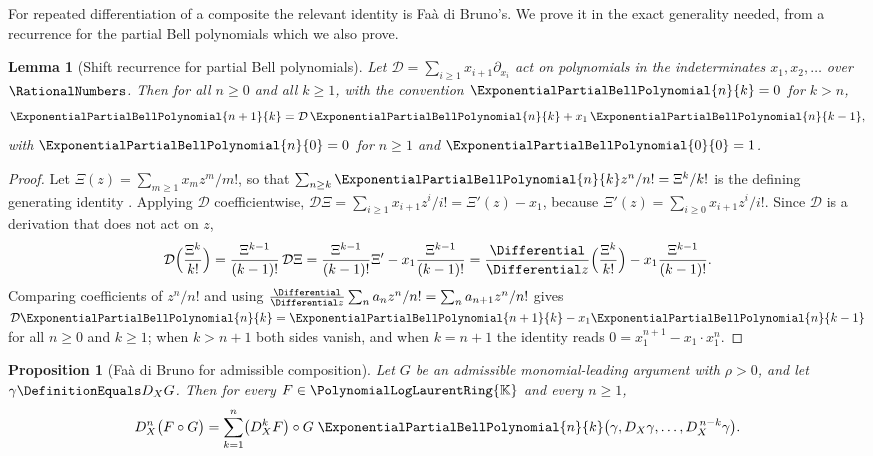 \documentclass[11pt,oneside]{article}
\theoremstyle{plain}
\newtheorem{proposition}[theorem]{Proposition}
\newtheorem{lemma}[theorem]{Lemma}
\theoremstyle{definition}
\theoremstyle{remark}
\newcommand{\K}{\mathbb{K}}
\newcommand{\PLlau}{\PolynomialLogLaurentRing{\K}}       %
\newcommand{\DX}{D_{X}}                                  %
\newcommand{\compose}{\mathbin{\circ}}
\begin{document}
For repeated differentiation of a composite the relevant identity is Fa\`a di
Bruno's.  We prove it in the exact generality needed, from a recurrence for
the partial Bell polynomials which we also prove.

\begin{lemma}[Shift recurrence for partial Bell polynomials]
\label{plt:lem:tay-bell-recurrence}
Let \(\mathcal D=\sum_{i\ge1}x_{i+1}\partial_{x_{i}}\) act on polynomials in
the indeterminates \(x_{1},x_{2},\ldots\) over \(\RationalNumbers\).  Then for
all \(n\ge0\) and all \(k\ge1\), with the convention
\(\ExponentialPartialBellPolynomial{n}{k}=0\) for \(k>n\),
\begin{equation}\label{plt:eq:tay-bell-recurrence}
 \ExponentialPartialBellPolynomial{n+1}{k}
 =\mathcal D\,\ExponentialPartialBellPolynomial{n}{k}
  +x_{1}\,\ExponentialPartialBellPolynomial{n}{k-1},
\end{equation}
with \(\ExponentialPartialBellPolynomial{n}{0}=0\) for \(n\ge1\) and
\(\ExponentialPartialBellPolynomial{0}{0}=1\).
\end{lemma}

\begin{proof}
Let \(\Xi(z)=\sum_{m\ge1}x_{m}z^{m}/m!\), so that
\(\sum_{n\ge k}\ExponentialPartialBellPolynomial{n}{k}z^{n}/n!=\Xi^{k}/k!\)
is the defining generating identity \cite{comtet-book}.  Applying
\(\mathcal D\) coefficientwise,
\(\mathcal D\Xi=\sum_{i\ge1}x_{i+1}z^{i}/i!=\Xi'(z)-x_{1}\), because
\(\Xi'(z)=\sum_{i\ge0}x_{i+1}z^{i}/i!\).  Since \(\mathcal D\) is a derivation
that does not act on \(z\),
\[
 \mathcal D\Bigl(\frac{\Xi^{k}}{k!}\Bigr)
 =\frac{\Xi^{k-1}}{(k-1)!}\,\mathcal D\Xi
 =\frac{\Xi^{k-1}}{(k-1)!}\Xi'
  -x_{1}\frac{\Xi^{k-1}}{(k-1)!}
 =\frac{\Differential}{\Differential z}\Bigl(\frac{\Xi^{k}}{k!}\Bigr)
  -x_{1}\frac{\Xi^{k-1}}{(k-1)!} .
\]
Comparing coefficients of \(z^{n}/n!\) and using
\(\frac{\Differential}{\Differential z}\sum_n a_n z^{n}/n!
 =\sum_n a_{n+1}z^{n}/n!\) gives
\(\mathcal D\ExponentialPartialBellPolynomial{n}{k}
 =\ExponentialPartialBellPolynomial{n+1}{k}
  -x_{1}\ExponentialPartialBellPolynomial{n}{k-1}\)
for all \(n\ge0\) and \(k\ge1\); when \(k>n+1\) both sides vanish, and when
\(k=n+1\) the identity reads \(0=x_{1}^{n+1}-x_{1}\cdot x_{1}^{n}\).
\end{proof}

\begin{proposition}[Fa\`a di Bruno for admissible composition]
\label{plt:prop:tay-faa-di-bruno}
Let \(G\) be an admissible monomial-leading argument with \(\rho>0\), and let
\(\gamma\DefinitionEquals\DX G\).  Then for every \(F\in\PLlau\) and every
\(n\ge1\),
\begin{equation}\label{plt:eq:tay-faa-di-bruno}
 \DX^{n}\bigl(F\compose G\bigr)
 =\sum_{k=1}^{n}\bigl(\DX^{k}F\bigr)\compose G\;
  \ExponentialPartialBellPolynomial{n}{k}
   \bigl(\gamma,\DX\gamma,\ldots,\DX^{\,n-k}\gamma\bigr).
\end{equation}
\end{proposition}
\end{document}
